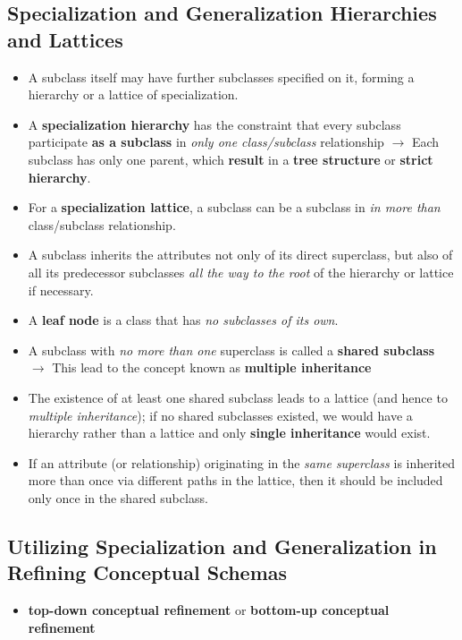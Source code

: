 \documentclass[10pt]{article}
\newcommand{\tf}{\textbf}
\newcommand{\ti}{\textit}
\begin{document}
\subsection{Specialization and Generalization Hierarchies and Lattices}
\begin{itemize}
	\item A subclass itself may have further subclasses specified on it, forming a hierarchy or a lattice of specialization.
	\item A \tf{specialization hierarchy} has the constraint that every subclass participate \tf{as a subclass} in \ti{only one class/subclass} relationship $\rightarrow$ Each subclass has only one parent, which \tf{result} in a \tf{tree structure} or \tf{strict hierarchy}.
	\item For a \tf{specialization lattice}, a subclass can be a subclass in \ti{in more than} class/subclass relationship.
	\item A subclass inherits the attributes not only of its direct superclass, but also of all its predecessor subclasses \ti{all the way to the root} of the hierarchy or lattice if necessary.
	\item A \tf{leaf node} is a class that has \ti{no subclasses of its own}.
	\item A subclass with \ti{no more than one} superclass is called a \tf{shared subclass} $\rightarrow$ This lead to the concept known as \tf{multiple inheritance}
	\item The existence of at least one shared subclass leads to a lattice (and hence to \ti{multiple inheritance}); if no shared subclasses existed, we would have a hierarchy rather than a lattice and only \tf{single inheritance} would exist.
	\item If an attribute (or relationship) originating in the \ti{same superclass} is inherited more than once via different paths in the lattice, then it should be included only once in the shared subclass.   
\end{itemize}

\subsection{Utilizing Specialization and Generalization in Refining Conceptual Schemas}
\begin{itemize}
	\item \tf{top-down conceptual refinement} or \tf{bottom-up conceptual refinement}
\end{itemize}
\end{document}
